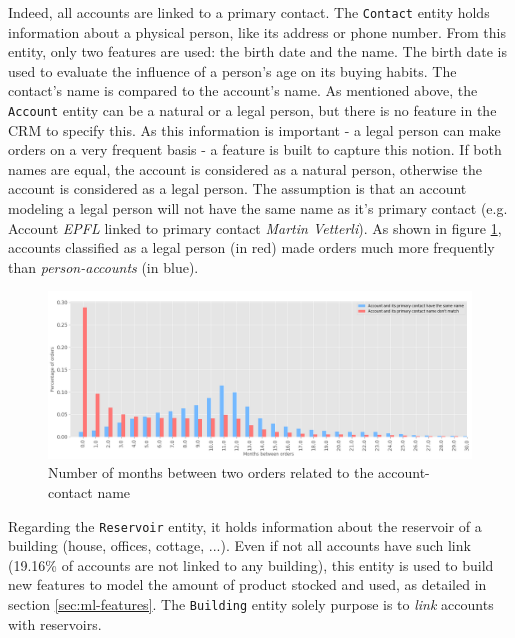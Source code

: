 Indeed, all accounts are linked to a primary contact. The \texttt{Contact} entity holds information about a physical person, like its address or phone number. From this entity, only two features are used: the birth date and the name. The birth date is used to evaluate the influence of a person's age on its buying habits. The contact's name is compared to the account's name. As mentioned above, the \texttt{Account} entity can be a natural or a legal person, but there is no feature in the CRM to specify this. As this information is important - a legal person can make orders on a very frequent basis - a feature is built to capture this notion. If both names are equal, the account is considered as a natural person, otherwise the account is considered as a legal person. The assumption is that an account modeling a legal person will not have the same name as it's primary contact (e.g. Account \textit{EPFL} linked to primary contact \textit{Martin Vetterli}). As shown in figure \ref{fig:account-contact-name-orders}, accounts classified as a legal person (in red) made orders much more frequently than \textit{person-accounts} (in blue).

\begin{figure}[h]
    \centering
    \includegraphics[width=15cm]{images/account-contact-name-orders.png}
    \caption[Account and contact's name influence on order's frequency]{Number of months between two orders related to the account-contact name}
    \label{fig:account-contact-name-orders}
\end{figure}

Regarding the \texttt{Reservoir} entity, it holds information about the reservoir of a building (house, offices, cottage, ...). Even if not all accounts have such link (19.16\% of accounts are not linked to any building), this entity is used to build new features to model the amount of product stocked and used, as detailed in section \ref{sec:ml-features}. The \texttt{Building} entity solely purpose is to \textit{link} accounts with reservoirs.

